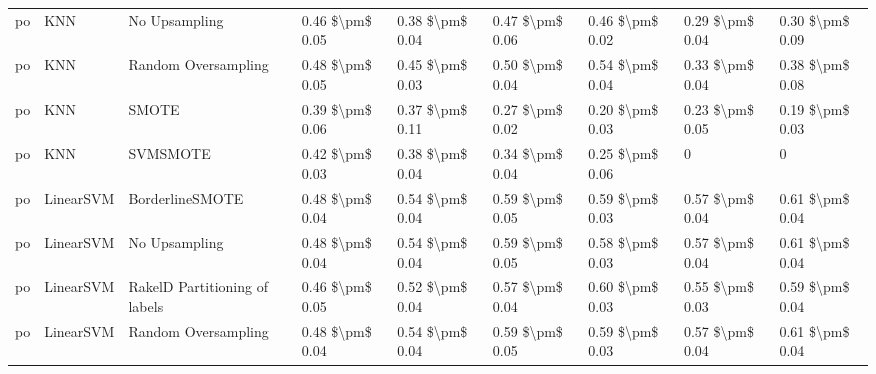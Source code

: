 \begin{tabular}{lllllllll}
      po &                             KNN &                 No Upsampling & 0.46 \$\textbackslash pm\$ 0.05 &           0.38 \$\textbackslash pm\$ 0.04 &       0.47 \$\textbackslash pm\$ 0.06 &        0.46 \$\textbackslash pm\$ 0.02 &                         0.29 \$\textbackslash pm\$ 0.04 &     0.30 \$\textbackslash pm\$ 0.09 \\
      po &                             KNN &           Random Oversampling & 0.48 \$\textbackslash pm\$ 0.05 &           0.45 \$\textbackslash pm\$ 0.03 &       0.50 \$\textbackslash pm\$ 0.04 &        0.54 \$\textbackslash pm\$ 0.04 &                         0.33 \$\textbackslash pm\$ 0.04 &     0.38 \$\textbackslash pm\$ 0.08 \\
      po &                             KNN &                         SMOTE & 0.39 \$\textbackslash pm\$ 0.06 &           0.37 \$\textbackslash pm\$ 0.11 &       0.27 \$\textbackslash pm\$ 0.02 &        0.20 \$\textbackslash pm\$ 0.03 &                         0.23 \$\textbackslash pm\$ 0.05 &     0.19 \$\textbackslash pm\$ 0.03 \\
      po &                             KNN &                      SVMSMOTE & 0.42 \$\textbackslash pm\$ 0.03 &           0.38 \$\textbackslash pm\$ 0.04 &       0.34 \$\textbackslash pm\$ 0.04 &        0.25 \$\textbackslash pm\$ 0.06 &                                       0 &                   0 \\
      po &                       LinearSVM &               BorderlineSMOTE & 0.48 \$\textbackslash pm\$ 0.04 &           0.54 \$\textbackslash pm\$ 0.04 &       0.59 \$\textbackslash pm\$ 0.05 &        0.59 \$\textbackslash pm\$ 0.03 &                         0.57 \$\textbackslash pm\$ 0.04 &     0.61 \$\textbackslash pm\$ 0.04 \\
      po &                       LinearSVM &                 No Upsampling & 0.48 \$\textbackslash pm\$ 0.04 &           0.54 \$\textbackslash pm\$ 0.04 &       0.59 \$\textbackslash pm\$ 0.05 &        0.58 \$\textbackslash pm\$ 0.03 &                         0.57 \$\textbackslash pm\$ 0.04 &     0.61 \$\textbackslash pm\$ 0.04 \\
      po &                       LinearSVM & RakelD Partitioning of labels & 0.46 \$\textbackslash pm\$ 0.05 &           0.52 \$\textbackslash pm\$ 0.04 &       0.57 \$\textbackslash pm\$ 0.04 &        0.60 \$\textbackslash pm\$ 0.03 &                         0.55 \$\textbackslash pm\$ 0.03 &     0.59 \$\textbackslash pm\$ 0.04 \\
      po &                       LinearSVM &           Random Oversampling & 0.48 \$\textbackslash pm\$ 0.04 &           0.54 \$\textbackslash pm\$ 0.04 &       0.59 \$\textbackslash pm\$ 0.05 &        0.59 \$\textbackslash pm\$ 0.03 &                         0.57 \$\textbackslash pm\$ 0.04 &     0.61 \$\textbackslash pm\$ 0.04 \\

\end{tabular}

